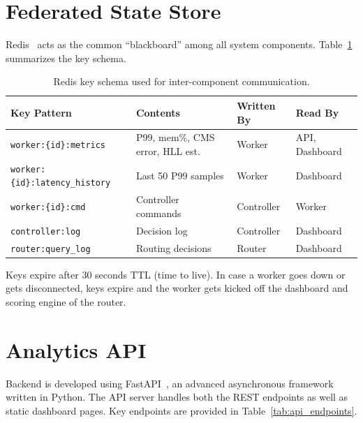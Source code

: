 \section{Federated State Store}
Redis~\cite{redis} acts as the common ``blackboard'' among all system components. Table~\ref{tab:redis_keys} summarizes the key schema.

\begin{table}[htbp]
\centering
\begin{tabular}{l l l l}
\toprule
\textbf{Key Pattern} & \textbf{Contents} & \textbf{Written By} & \textbf{Read By} \\
\midrule
\texttt{worker:\{id\}:metrics}    & P99, mem\%, CMS error, HLL est. & Worker     & API, Dashboard \\
\texttt{worker:\{id\}:latency\_history} & Last 50 P99 samples       & Worker     & Dashboard \\
\texttt{worker:\{id\}:cmd}        & Controller commands             & Controller & Worker \\
\texttt{controller:log}           & Decision log                    & Controller & Dashboard \\
\texttt{router:query\_log}        & Routing decisions                & Router     & Dashboard \\
\bottomrule
\end{tabular}
\caption{Redis key schema used for inter-component communication.}
\label{tab:redis_keys}
\end{table}

Keys expire after 30 seconds TTL (time to live). In case a worker goes down or gets disconnected, keys expire and the worker gets kicked off the dashboard and scoring engine of the router.

\section{Analytics API}

Backend is developed using FastAPI~\cite{fastapi}, an advanced asynchronous framework written in Python. The API server handles both the REST endpoints as well as static dashboard pages. Key endpoints are provided in Table~\ref{tab:api_endpoints}.

